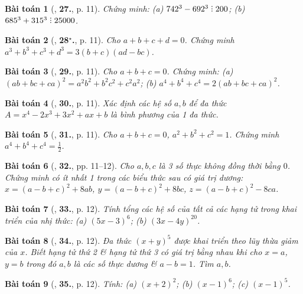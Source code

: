 \documentclass{article}
\numberwithin{equation}{section}
\newtheorem{baitoan}{Bài toán}
\DeclareRobustCommand{\divby}{%
	\mathrel{\vbox{\baselineskip.65ex\lineskiplimit0pt\hbox{.}\hbox{.}\hbox{.}}}%
}
\begin{document}
\begin{baitoan}[\cite{Tuyen_Toan_8}, \textbf{27.}, p. 11]
	Chứng minh: (a) $742^3 - 692^3\divby200$; (b) $685^3 + 315^3\divby25000$.
\end{baitoan}

\begin{baitoan}[\cite{Tuyen_Toan_8}, \textbf{28${}^\star$.}, p. 11]
	Cho $a + b + c + d = 0$. Chứng minh $a^3 + b^3 + c^3 + d^3 = 3(b + c)(ad - bc)$.
\end{baitoan}

\begin{baitoan}[\cite{Tuyen_Toan_8}, \textbf{29.}, p. 11]
	Cho $a + b + c = 0$. Chứng minh: (a) $(ab + bc + ca)^2 = a^2b^2 + b^2c^2 + c^2a^2$; (b) $a^4 + b^4 + c^4 = 2(ab + bc + ca)^2$.
\end{baitoan}

\begin{baitoan}[\cite{Tuyen_Toan_8}, \textbf{30.}, p. 11]
	Xác định các hệ số $a,b$ để đa thức $A = x^4 - 2x^3 + 3x^2 + ax + b$ là bình phương của 1 đa thức.
\end{baitoan}

\begin{baitoan}[\cite{Tuyen_Toan_8}, \textbf{31.}, p. 11]
	Cho $a + b + c = 0$, $a^2 + b^2 + c^2 = 1$. Chứng minh $a^4 + b^4 + c^4 = \frac{1}{2}$.
\end{baitoan}

\begin{baitoan}[\cite{Tuyen_Toan_8}, \textbf{32.}, pp. 11--12]
	Cho $a,b,c$ là 3 số thực không đồng thời bằng $0$. Chứng minh có ít nhất 1 trong các biểu thức sau có giá trị dương: $x = (a - b + c)^2 + 8ab$, $y = (a - b +  c)^2 + 8bc$, $z = (a - b + c)^2 - 8ca$.
\end{baitoan}

\begin{baitoan}[\cite{Tuyen_Toan_8}, \textbf{33.}, p. 12]
	Tính tổng các hệ số của tất cả các hạng tử trong khai triển của nhị thức: (a) $(5x - 3)^6$; (b) $(3x - 4y)^{20}$.
\end{baitoan}

\begin{baitoan}[\cite{Tuyen_Toan_8}, \textbf{34.}, p. 12]
	Đa thức $(x + y)^5$ được khai triển theo lũy thừa giảm của $x$. Biết hạng tử thứ 2 \& hạng tử thứ 3 có giá trị bằng nhau khi cho $x = a$, $y = b$ trong đó $a,b$ là các số thực dương \& $a - b = 1$. Tìm $a,b$.
\end{baitoan}

\begin{baitoan}[\cite{Tuyen_Toan_8}, \textbf{35.}, p. 12]
	Tính: (a) $(x + 2)^2$; (b) $(x - 1)^6$; (c) $(x - 1)^5$.
\end{baitoan}
\end{document}

